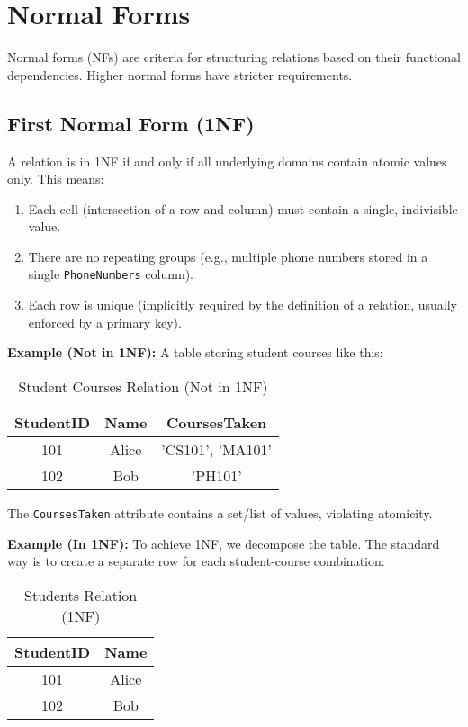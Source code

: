 \documentclass[12pt]{book}
\begin{document}
\section{Normal Forms}

Normal forms (NFs) are criteria for structuring relations based on their functional dependencies. Higher normal forms have stricter requirements.

\subsection{First Normal Form (1NF)}

A relation is in 1NF if and only if all underlying domains contain atomic values only. This means:
\begin{enumerate} %
    \item Each cell (intersection of a row and column) must contain a single, indivisible value.
    \item There are no repeating groups (e.g., multiple phone numbers stored in a single \texttt{PhoneNumbers} column).
    \item Each row is unique (implicitly required by the definition of a relation, usually enforced by a primary key).
\end{enumerate}

\textbf{Example (Not in 1NF):}
A table storing student courses like this:

\begin{table}[htbp]
\centering
\begin{tabular}{@{}ccc@{}}
\toprule
StudentID & Name & CoursesTaken \\
\midrule
101 & Alice & {'CS101', 'MA101'} \\ %
102 & Bob & {'PH101'} \\ %
\bottomrule
\end{tabular}
\caption{Student Courses Relation (Not in 1NF)}
\label{tab:not_1nf}
\end{table}
The \texttt{CoursesTaken} attribute contains a set/list of values, violating atomicity.

\textbf{Example (In 1NF):}
To achieve 1NF, we decompose the table. The standard way is to create a separate row for each student-course combination:

\begin{table}[htbp]
\centering
\begin{tabular}{@{}cc@{}} %
\toprule
StudentID & Name \\
\midrule
101 & Alice \\
102 & Bob \\
\bottomrule
\end{tabular}
\caption{Students Relation (1NF)}
\label{tab:students_1nf}
\end{table}
\end{document}
